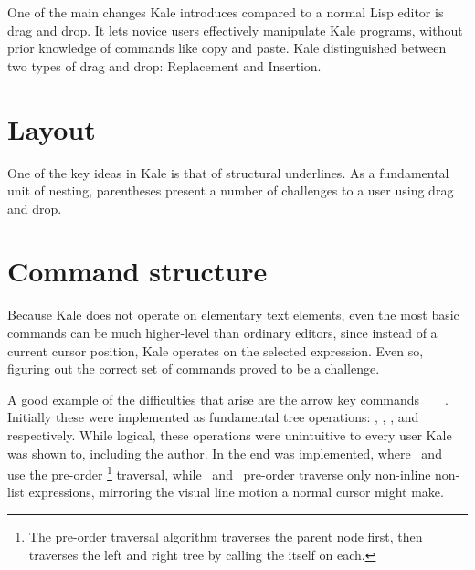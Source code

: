 One of the main changes Kale introduces compared to a normal Lisp editor is
drag and drop. It lets novice users effectively manipulate Kale programs,
without prior knowledge of commands like copy and paste. Kale distinguished
between two types of drag and drop: Replacement and Insertion. 

\section{Layout}

One of the key ideas in Kale is that of structural underlines. As a
fundamental unit of nesting, parentheses present a number of challenges to a
user using drag and drop.

\section{Command structure}

Because Kale does not operate on elementary text elements, even the most
basic
commands can be much higher-level than ordinary editors, since instead of a
current cursor position, Kale operates on the selected expression. Even so,
figuring out the correct set of commands proved to be a challenge.

A good example of the difficulties that arise are the arrow key
commands~\ak{^}~~\ak{<}~\ak{>}. Initially these were implemented as
fundamental tree operations: , ,
, and  respectively.
While logical, these operations were unintuitive to every user
Kale was shown to, including the author. In the end  was
implemented, where~\ak{<} and~\ak{>} use the pre-order%
%
\footnote{The pre-order traversal algorithm traverses the parent node first,
then traverses the left and right tree by calling the itself on each.}
%
traversal, while~\ak{^} and~
pre-order traverse only non-inline non-list expressions, mirroring the visual
line motion a normal cursor might make.


